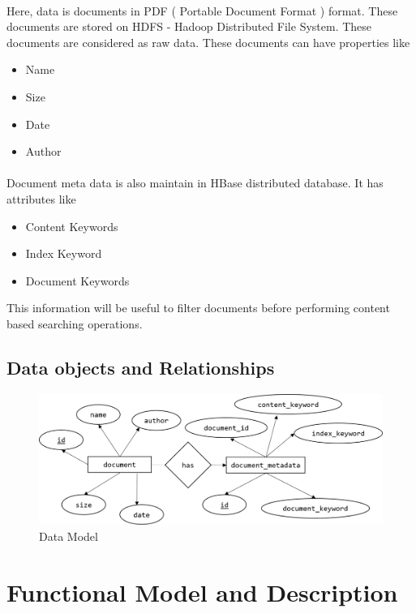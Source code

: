 \documentclass[oneside,a4paper,12pt]{report}
\begin{document}
\paragraph{}
Here, data is documents in PDF ( Portable Document Format ) format. These documents are stored on HDFS - Hadoop Distributed File System. These documents are considered as raw data. These documents can have properties like
\begin{itemize}
\item Name
\item Size
\item Date
\item Author
\end{itemize}
\paragraph{}
Document meta data is also maintain in HBase distributed database. It has attributes like
\begin{itemize}
\item Content Keywords
\item Index Keyword
\item Document Keywords
\end{itemize}
This information will be useful to filter documents before performing content based  searching operations.

\subsection{Data objects and Relationships}
\begin{figure}[H]
\includegraphics{data_model}
\caption{Data Model}
\end{figure}

\section{Functional Model and Description}
\end{document}
